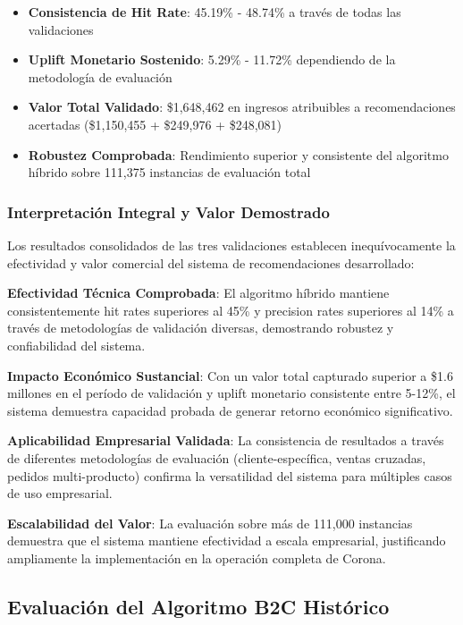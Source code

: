 \documentclass[twocolumn]{article}
\begin{document}
\begin{itemize}
    \item \textbf{Consistencia de Hit Rate}: 45.19\% - 48.74\% a través de todas las validaciones
    \item \textbf{Uplift Monetario Sostenido}: 5.29\% - 11.72\% dependiendo de la metodología de evaluación
    \item \textbf{Valor Total Validado}: \$1,648,462 en ingresos atribuibles a recomendaciones acertadas (\$1,150,455 + \$249,976 + \$248,081)
    \item \textbf{Robustez Comprobada}: Rendimiento superior y consistente del algoritmo híbrido sobre 111,375 instancias de evaluación total
\end{itemize}

\subsubsection{Interpretación Integral y Valor Demostrado}

Los resultados consolidados de las tres validaciones establecen inequívocamente la efectividad y valor comercial del sistema de recomendaciones desarrollado:

\textbf{Efectividad Técnica Comprobada}: El algoritmo híbrido mantiene consistentemente hit rates superiores al 45\% y precision rates superiores al 14\% a través de metodologías de validación diversas, demostrando robustez y confiabilidad del sistema.

\textbf{Impacto Económico Sustancial}: Con un valor total capturado superior a \$1.6 millones en el período de validación y uplift monetario consistente entre 5-12\%, el sistema demuestra capacidad probada de generar retorno económico significativo.

\textbf{Aplicabilidad Empresarial Validada}: La consistencia de resultados a través de diferentes metodologías de evaluación (cliente-específica, ventas cruzadas, pedidos multi-producto) confirma la versatilidad del sistema para múltiples casos de uso empresarial.

\textbf{Escalabilidad del Valor}: La evaluación sobre más de 111,000 instancias demuestra que el sistema mantiene efectividad a escala empresarial, justificando ampliamente la implementación en la operación completa de Corona.

\subsection{Evaluación del Algoritmo B2C Histórico}
\end{document}
